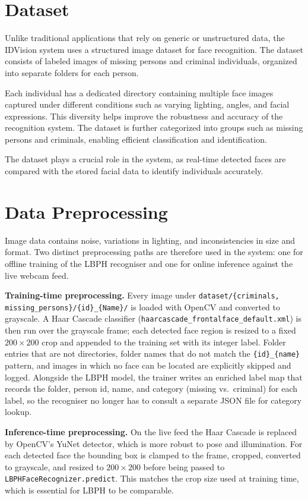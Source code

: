 \documentclass[11pt]{report}
\begin{document}
\section{Dataset}

Unlike traditional applications that rely on generic or unstructured data, the IDVision system uses a structured image dataset for face recognition. The dataset consists of labeled images of missing persons and criminal individuals, organized into separate folders for each person.

Each individual has a dedicated directory containing multiple face images captured under different conditions such as varying lighting, angles, and facial expressions. This diversity helps improve the robustness and accuracy of the recognition system. The dataset is further categorized into groups such as missing persons and criminals, enabling efficient classification and identification.

The dataset plays a crucial role in the system, as real-time detected faces are compared with the stored facial data to identify individuals accurately.
\section{Data Preprocessing}

Image data contains noise, variations in lighting, and inconsistencies in size and format. Two distinct preprocessing paths are therefore used in the system: one for offline training of the LBPH recogniser and one for online inference against the live webcam feed.

\textbf{Training-time preprocessing.} Every image under \texttt{dataset/\{criminals,\,missing\_persons\}/\{id\}\_\{Name\}/} is loaded with OpenCV and converted to grayscale. A Haar Cascade classifier (\texttt{haarcascade\_frontalface\_default.xml}) is then run over the grayscale frame; each detected face region is resized to a fixed $200\times200$ crop and appended to the training set with its integer label. Folder entries that are not directories, folder names that do not match the \texttt{\{id\}\_\{name\}} pattern, and images in which no face can be located are explicitly skipped and logged. Alongside the LBPH model, the trainer writes an enriched label map that records the folder, person id, name, and category (missing vs.\ criminal) for each label, so the recogniser no longer has to consult a separate JSON file for category lookup.

\textbf{Inference-time preprocessing.} On the live feed the Haar Cascade is replaced by OpenCV's YuNet detector, which is more robust to pose and illumination. For each detected face the bounding box is clamped to the frame, cropped, converted to grayscale, and resized to $200\times200$ before being passed to \texttt{LBPHFaceRecognizer.predict}. This matches the crop size used at training time, which is essential for LBPH to be comparable.
\end{document}
